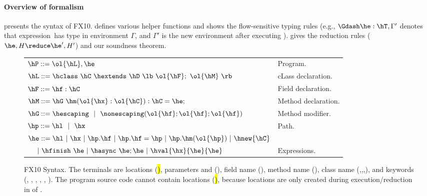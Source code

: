\paragraph{Overview of formalism}
 presents the syntax of FX10.
 defines various helper functions and shows the flow-sensitive typing rules
    (e.g., $\Gdash \he:\hT, \Gamma'$ denotes that expression~\he has type \hT in environment $\Gamma$, and $\Gamma'$ is the new environment after executing \he).
 gives the reduction rules ($\he,H \reduce \he',H'$) and our soundness theorem.




\begin{figure}[htpb!]
\begin{center}
\begin{tabular}{|l|l|}
\hline

$\hP ::= \ol{\hL},\he$ & Program. \\

$\hL ::= \hclass ~ \hC~\hextends~\hD~\lb~\ol{\hF};~\ol{\hM}~\rb$
& cLass declaration. \\

$\hF ::= \hf:\hC$
& Field declaration. \\

$\hM ::= \hG ~ \hm(\ol{\hx}:\ol{\hC}):\hC=\he;$
& Method declaration. \\

$\hG ::= \hescaping ~~|~~ \nonescaping(\ol{\hf};\ol{\hf};\ol{\hf})$
& Method modifier. \\

$\hp ::= \hl ~~|~~ \hx$
& Path. \\ %

$\he ::= \hl ~|~ \hx ~|~ \hp.\hf ~|~ \hp.\hf = \hp ~|~ \hp.\hm(\ol{\hp}) ~|~ \hnew{\hC}$ &\\
$~~~~|~ \hfinish~\he~|~ \hasync~\he;\he ~|~ \hval{\hx}{\he}{\he}$
& Expressions. \\ %

\hline
\end{tabular}
\end{center}
\caption{FX10 Syntax.
    The terminals are locations (\hl), parameters and \this (\hx), field name (\hf), method name (\hm), class name (\hB,\hC,\hD,\hObject),
        and keywords (\hescaping, \nonescaping, \hhnew, \finish, \async, ).
    The program source code cannot contain locations (\hl), because locations are only created during execution/reduction in  of .
    }
\label{Figure:syntax}
\end{figure}


